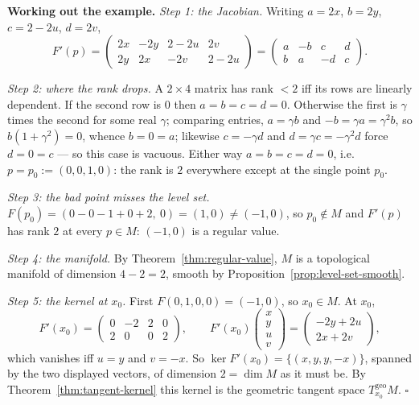 \documentclass[11pt]{report}
\renewenvironment{proof}[1][Proof]{\noindent\textbf{#1.} }{\hfill$\square$\par\vspace{5pt}}
\newcommand{\geo}{\mathrm{geo}}
\begin{document}
\begin{proof}[Working out the example]
\emph{Step 1: the Jacobian.} Writing $a = 2x$, $b = 2y$, $c = 2 - 2u$, $d = 2v$,
\[
F'(p) = \begin{pmatrix} 2x & -2y & 2 - 2u & 2v \\ 2y & 2x & -2v & 2 - 2u \end{pmatrix}
= \begin{pmatrix} a & -b & c & d \\ b & a & -d & c \end{pmatrix}.
\]

\emph{Step 2: where the rank drops.} A $2 \times 4$ matrix has rank $< 2$ iff its rows are linearly dependent. If the second row is $0$ then $a = b = c = d = 0$. Otherwise the first is $\gamma$ times the second for some real $\gamma$; comparing entries, $a = \gamma b$ and $-b = \gamma a = \gamma^2 b$, so $b(1+\gamma^2) = 0$, whence $b = 0 = a$; likewise $c = -\gamma d$ and $d = \gamma c = -\gamma^2 d$ force $d = 0 = c$ --- so this case is vacuous. Either way $a = b = c = d = 0$, i.e.\ $p = p_0 := (0,0,1,0)$: the rank is $2$ everywhere except at the single point $p_0$.

\emph{Step 3: the bad point misses the level set.} $F(p_0) = (0 - 0 - 1 + 0 + 2,\ 0) = (1,0) \neq (-1,0)$, so $p_0 \notin M$ and $F'(p)$ has rank $2$ at every $p \in M$: $(-1,0)$ is a regular value.

\emph{Step 4: the manifold.} By Theorem~\ref{thm:regular-value}, $M$ is a topological manifold of dimension $4 - 2 = 2$, smooth by Proposition~\ref{prop:level-set-smooth}.

\emph{Step 5: the kernel at $x_0$.} First $F(0,1,0,0) = (-1,0)$, so $x_0 \in M$. At $x_0$,
\[
F'(x_0) = \begin{pmatrix} 0 & -2 & 2 & 0 \\ 2 & 0 & 0 & 2 \end{pmatrix},
\qquad
F'(x_0)\begin{pmatrix} x \\ y \\ u \\ v \end{pmatrix} = \begin{pmatrix} -2y + 2u \\ 2x + 2v \end{pmatrix},
\]
which vanishes iff $u = y$ and $v = -x$. So $\ker F'(x_0) = \{(x, y, y, -x)\}$, spanned by the two displayed vectors, of dimension $2 = \dim M$ as it must be. By Theorem~\ref{thm:tangent-kernel} this kernel is the geometric tangent space $T^{\geo}_{x_0}M$.
\end{proof}
\end{document}
